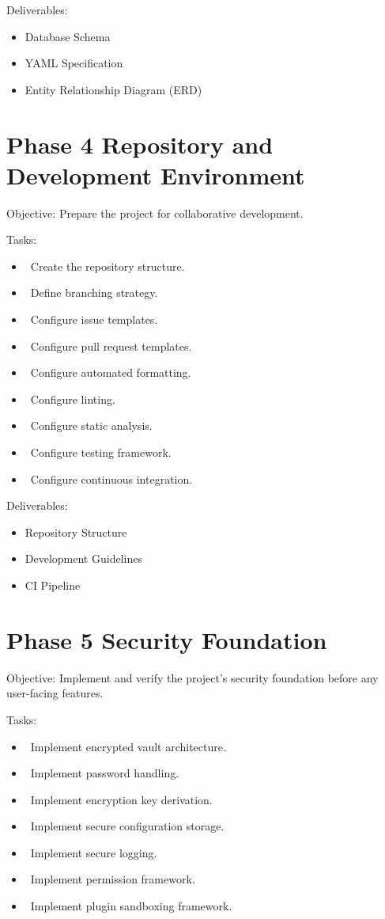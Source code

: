 Deliverables:
\begin{itemize}
	\item Database Schema
	\item YAML Specification
	\item Entity Relationship Diagram (ERD)
\end{itemize}
\section{Phase 4 Repository and Development Environment}
Objective: Prepare the project for collaborative development.

Tasks:
\begin{itemize}
	\item[] \checkbox\ Create the repository structure.
	\item[] \checkbox\ Define branching strategy.
	\item[] \checkbox\ Configure issue templates.
	\item[] \checkbox\ Configure pull request templates.
	\item[] \checkbox\ Configure automated formatting.
	\item[] \checkbox\ Configure linting.
	\item[] \checkbox\ Configure static analysis.
	\item[] \checkbox\ Configure testing framework.
	\item[] \checkbox\ Configure continuous integration.
\end{itemize}

Deliverables:
\begin{itemize}
	\item Repository Structure
	\item Development Guidelines
	\item CI Pipeline
\end{itemize}
\section{Phase 5 Security Foundation}
Objective: Implement and verify the project's security foundation before any user-facing features.

Tasks:
\begin{itemize}
	\item[] \checkbox\ Implement encrypted vault architecture.
	\item[] \checkbox\ Implement password handling.
	\item[] \checkbox\ Implement encryption key derivation.
	\item[] \checkbox\ Implement secure configuration storage.
	\item[] \checkbox\ Implement secure logging.
	\item[] \checkbox\ Implement permission framework.
	\item[] \checkbox\ Implement plugin sandboxing framework.
\end{itemize}

